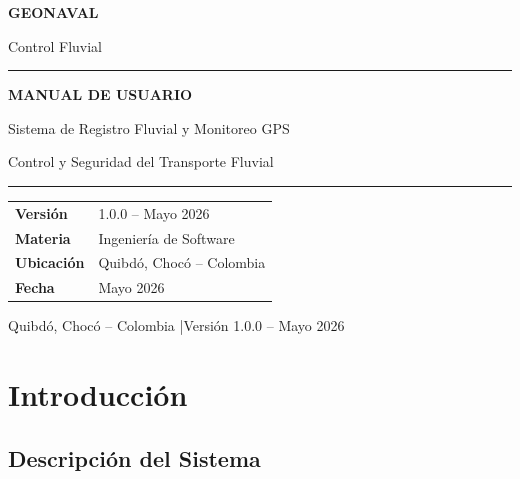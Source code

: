 \documentclass[12pt,a4paper]{report}
\begin{document}
\begin{titlepage}
  \centering
  \vspace*{2cm}
  {\Huge\bfseries\color{navyblue} GEONAVAL\par}
  \vspace{0.3cm}
  {\Large\color{gray} Control Fluvial\par}
  \vspace{1.2cm}
  \rule{0.8\textwidth}{1.5pt}
  \vspace{0.5cm}

  {\LARGE\bfseries MANUAL DE USUARIO\par}
  \vspace{0.4cm}
  {\large Sistema de Registro Fluvial y Monitoreo GPS\par}
  \vspace{0.2cm}
  {\normalsize Control y Seguridad del Transporte Fluvial\par}

  \vspace{1cm}
  \rule{0.8\textwidth}{0.8pt}
  \vspace{1cm}

  \begin{tabular}{@{}ll@{}}
    \toprule
    \textbf{Versión}   & 1.0.0 – Mayo 2026 \\
    \textbf{Materia}   & Ingeniería de Software \\
    \textbf{Ubicación} & Quibdó, Chocó – Colombia \\
    \textbf{Fecha}     & Mayo 2026 \\
    \bottomrule
  \end{tabular}

  \vfill
  {\small\color{gray} Quibdó, Chocó – Colombia \quad|\quad Versión 1.0.0 – Mayo 2026\par}
\end{titlepage}

\tableofcontents
\newpage

\chapter{Introducción}

\section{Descripción del Sistema}
\end{document}
